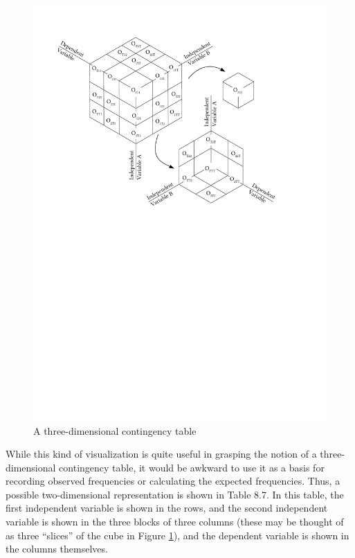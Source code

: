 \begin{figure}[!htbp]
\caption{A three-dimensional contingency table}
\label{fig:cfaschematic}
\includegraphics[width=\textwidth,keepaspectratio]{figures/cfaschematic}
\end{figure}

While this kind of visualization is quite useful in grasping the notion of a three-dimensional contingency table, it would be awkward to use it as a basis for recording observed frequencies or calculating the expected frequencies. Thus, a possible two-dimensional representation is shown in Table 8.7. In this table, the first independent variable is shown in the rows, and the second independent variable is shown in the three blocks of three columns (these may be thought of as three ``slices'' of the cube in Figure \ref{fig:cfaschematic}), and the dependent variable is shown in the columns themselves.

